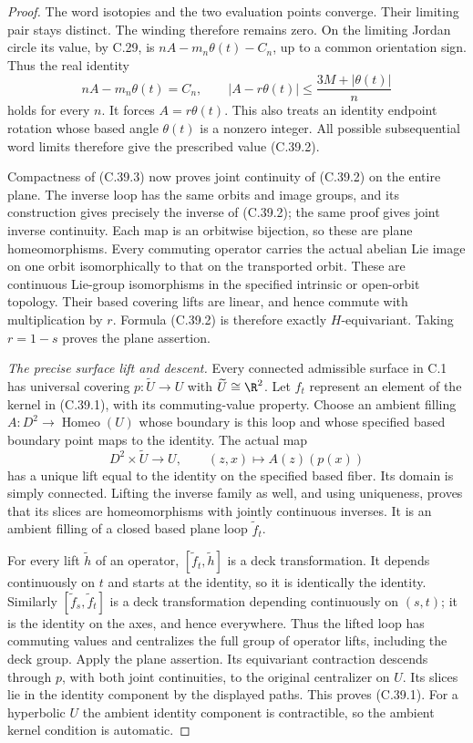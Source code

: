 \begin{proof}
The word isotopies and the two evaluation points
converge. Their limiting pair stays distinct.
The winding therefore remains zero. On the limiting
Jordan circle its value, by C.29, is
$nA-m_n\theta(t)-C_n$, up to a common orientation
sign. Thus the real identity
\[
 nA-m_n\theta(t)=C_n,\qquad
 |A-r\theta(t)|
       \leq\frac{3M+|\theta(t)|}{n}
                                                        \tag{C.39.7}
\]
holds for every $n$. It forces $A=r\theta(t)$.
This also treats an identity endpoint rotation
whose based angle $\theta(t)$ is a nonzero integer.
All possible subsequential word limits therefore
give the prescribed value (C.39.2).

Compactness of (C.39.3) now proves joint continuity
of (C.39.2) on the entire plane.
The inverse loop has the same orbits and image
groups, and its construction gives precisely the
inverse of (C.39.2); the same proof gives joint
inverse continuity. Each map is an orbitwise
bijection, so these are plane homeomorphisms.
Every commuting operator carries the actual
abelian Lie image on one orbit isomorphically to
that on the transported orbit. These are continuous
Lie-group isomorphisms in the specified intrinsic
or open-orbit topology. Their based covering lifts
are linear, and hence commute with multiplication
by $r$. Formula (C.39.2) is therefore exactly
$H$-equivariant. Taking $r=1-s$ proves the plane
assertion.

\emph{The precise surface lift and descent.}
Every connected admissible surface in C.1 has
universal covering $p:\widetilde U\to U$ with
$\widetilde U\cong\R^2$. Let $f_t$ represent an
element of the kernel in (C.39.1), with its
commuting-value property. Choose an ambient
filling $A:D^2\to\operatorname{Homeo}(U)$ whose
boundary is this loop and whose specified based
boundary point maps to the identity.
The actual map
\[
 D^2\times\widetilde U\longrightarrow U,\qquad
                  (z,x)\longmapsto A(z)(p(x))
                                                        \tag{C.39.8}
\]
has a unique lift equal to the identity on the
specified based fiber. Its domain is simply
connected. Lifting the inverse family as well,
and using uniqueness, proves that its slices are
homeomorphisms with jointly continuous inverses.
It is an ambient filling of a closed based
plane loop $\widetilde f_t$.

For every lift $\widetilde h$ of an operator,
$[\widetilde f_t,\widetilde h]$ is a deck
transformation. It depends continuously on $t$
and starts at the identity, so it is identically
the identity. Similarly
$[\widetilde f_s,\widetilde f_t]$ is a deck
transformation depending continuously on $(s,t)$;
it is the identity on the axes, and hence
everywhere. Thus the lifted loop has commuting
values and centralizes the full group of
operator lifts, including the deck group.
Apply the plane assertion. Its equivariant
contraction descends through $p$, with both
joint continuities, to the original centralizer
on $U$. Its slices lie in the identity component
by the displayed paths. This proves (C.39.1).
For a hyperbolic $U$ the ambient identity
component is contractible, so the ambient
kernel condition is automatic.
\end{proof}

